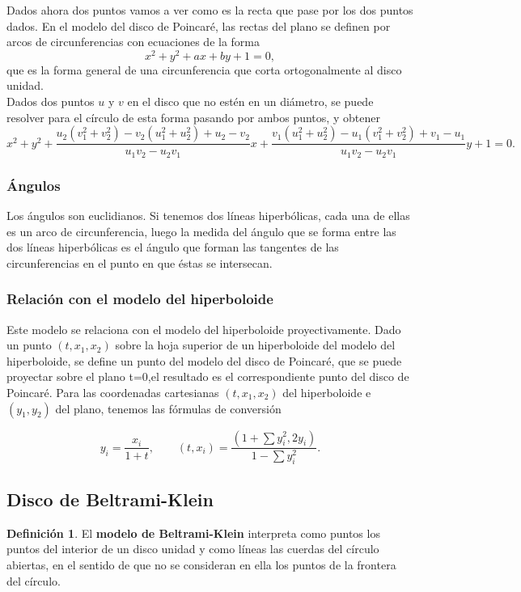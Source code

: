 \documentclass{article}
\theoremstyle{plain}
\theoremstyle{definition}
\newtheorem{definition}{Definición}
\theoremstyle{remark}
\begin{document}
Dados ahora dos puntos vamos a ver como es la recta que pase por los
dos puntos dados. En el modelo del disco de Poincaré, las rectas del
plano se definen por arcos de circunferencias con ecuaciones de la
forma
\[x^2+y^2+ax+by+1=0,\]
que es la forma general de una circunferencia que corta ortogonalmente al disco unidad.\\
Dados dos puntos $u$ y $v$ en el disco que no estén en un diámetro, se
puede resolver para el círculo de esta forma pasando por ambos puntos,
y obtener
$$x^{2}+y^{2}+{\frac {u_{2}(v_{1}^{2}+v_{2}^{2})-v_{2}(u_{1}^{2}+u_{2}^{2})+u_{2}-v_{2}}{u_{1}v_{2}-u_{2}v_{1}}}x+{\frac {v_{1}(u_{1}^{2}+u_{2}^{2})-u_{1}(v_{1}^{2}+v_{2}^{2})+v_{1}-u_{1}}{u_{1}v_{2}-u_{2}v_{1}}}y+1=0.$$

\subsubsection{Ángulos}
Los ángulos son euclidianos. Si tenemos dos líneas hiperbólicas, cada
una de ellas es un arco de circunferencia, luego la medida del ángulo
que se forma entre las dos líneas hiperbólicas es el ángulo que forman
las tangentes de las circunferencias en el punto en que éstas se
intersecan.

\subsubsection{Relación con el modelo del hiperboloide}
Este modelo se relaciona con el modelo del hiperboloide
proyectivamente. Dado un punto $(t, x_1,x_2)$ sobre la hoja superior
de un hiperboloide del modelo del hiperboloide, se define un punto del
modelo del disco de Poincaré, que se puede proyectar sobre el plano
t=0,el resultado es el correspondiente punto del disco de Poincaré.
Para las coordenadas cartesianas $(t,x_1,x_2)$ del hiperboloide e
$(y_1,y_2)$ del plano, tenemos las fórmulas de conversión

\[
  y_{i}=\frac {x_{i}}{1+t},
  \qquad
  (t,x_{i})=\frac {(1+\sum {y_{i}^{2}},2y_{i})}{1-\sum {y_{i}^{2}}}.
\]


\subsection{Disco de Beltrami-Klein}

\begin{definition}
  El \textbf{modelo de Beltrami-Klein} interpreta como puntos los puntos
  del interior de un disco unidad y como líneas las cuerdas del círculo
  abiertas, en el sentido de que no se consideran en ella los puntos de
  la frontera del círculo.
\end{definition}
\end{document}
